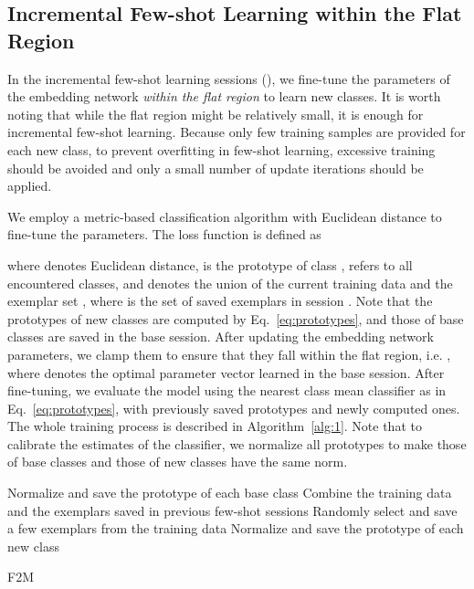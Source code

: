 \documentclass{article}
\begin{document}
\subsection{Incremental Few-shot Learning within the Flat Region} \label{sec:incremental}
In the incremental few-shot learning sessions (), we fine-tune the parameters  of the embedding network \textit{within the flat region} to learn new classes. It is worth noting that while the flat region might be relatively small, it is enough for incremental few-shot learning. Because  only few training samples are provided for each new class, to prevent overfitting in few-shot learning, excessive training should be avoided and only a small number of update iterations should be applied. 

We employ a metric-based classification algorithm with Euclidean distance to fine-tune the parameters. The loss function is defined as

where  denotes Euclidean distance,  is the prototype of class ,  refers to all encountered classes, and  denotes the union of the current training data  and the exemplar set , where  is the set of saved exemplars in session . 
Note that the prototypes of new classes are computed by Eq.~\ref{eq:prototypes}, and those of base classes are saved in the base session. After updating the embedding network parameters, we clamp them to ensure that they fall within the flat region, i.e. , where  denotes the optimal parameter vector learned in the base session. After fine-tuning, we evaluate the model using the nearest class mean classifier as in Eq.~\ref{eq:prototypes}, with previously saved prototypes and newly computed ones. The whole training process is described in Algorithm~\ref{alg:1}. Note that to calibrate the estimates of the classifier, we normalize all prototypes to make those of base classes and those of new classes have the same norm.

\begin{algorithm}[t]
\SetAlgoLined
{}
\tcp{\textcolor{blue}{Training over base classes }}
Normalize and save the prototype of each base class\;
\BlankLine
\tcp{\textcolor{blue}{Incremental learning }}
Combine the training data  and the exemplars saved in previous few-shot sessions \;
Randomly select and save a few exemplars from the training data \;
Normalize and save the prototype of each new class\;
\caption{F2M} \label{alg:1}
\end{algorithm} 
\end{document}
